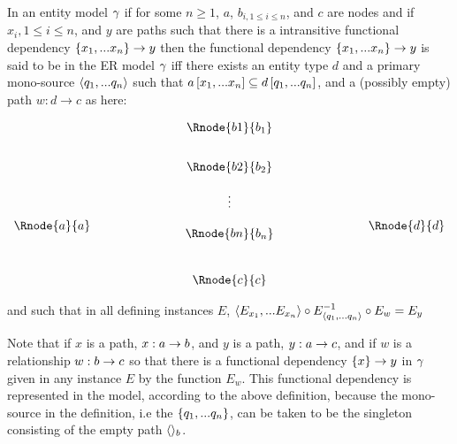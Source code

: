\begin{definition}
\noindent In an entity model $\gamma$  
if for some $n \geq 1$, $a$, $b_{i, 1 \leq i \leq n}$,  and $c$ are nodes and 
if  $x_{i}, 1 \leq i \leq n$, and $y$ are paths such
that there is a intransitive functional dependency $\{x_1,...x_n\} \rightarrow y$
 then the functional dependency $\{x_1,...x_n\} \rightarrow y$ is said to be  in the ER model $\gamma$ iff  there exists an entity type $d$ and a primary mono-source 
$\langle q_1,...q_n\rangle$  such that $a\left[x_1,...x_n\right]\subseteq d\left[q_1,...q_n\right]$, and a (possibly empty)
path $w:d\rightarrow c$ as here:

\setlength{\arraycolsep}{.2cm}
\begin{center}
$
\begin{array}{cp{2cm}c p{2cm} c}
             &  & \Rnode{b1}{b_1} & &               \\ [0.7cm]
						 &  & \Rnode{b2}{b_2} & &               \\ [0.4cm]
						 &  &     \vdots      & &               \\ [0.2cm]
\Rnode{a}{a} &  &                 & & \Rnode{d}{d}  \\ [-0.2cm]
             &  & \Rnode{bn}{b_n} & &               \\ [0.9cm]
             &  & \Rnode{c}{c}    & &               \\
\end{array}
$
\end{center}

and such that in all defining instances $E$, 
$\langle E_{x_1},...E_{x_n}\rangle \circ E^{-1}_{\langle q_1,...q_n\rangle}\circ E_w = E_y$
\end{definition}

Note that  if $x$ is a path, $x:a \rightarrow b$, and $y$ is a path, $y: a \rightarrow c$, and if $w$ is a
relationship $w: b \rightarrow c$ so that there is a functional dependency $\left\{x\right\} \rightarrow y$ in $\gamma$
given in any instance $E$ by the function $E_w$. This functional dependency is represented in the model, according to the above definition, because the mono-source in the definition, i.e the $\left\{q_1,...q_n\right\}$,
can be taken to be the singleton consisting of the empty path $\langle\rangle_b$. \\

